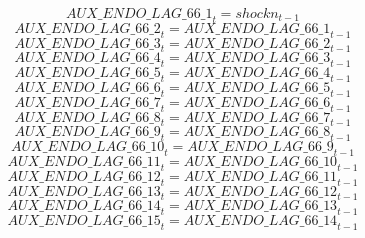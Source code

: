 \begin{dmath}
{AUX\_ENDO\_LAG\_66\_1}_{t}={{shockn}}_{t-1}
\end{dmath}
\begin{dmath}
{AUX\_ENDO\_LAG\_66\_2}_{t}={AUX\_ENDO\_LAG\_66\_1}_{t-1}
\end{dmath}
\begin{dmath}
{AUX\_ENDO\_LAG\_66\_3}_{t}={AUX\_ENDO\_LAG\_66\_2}_{t-1}
\end{dmath}
\begin{dmath}
{AUX\_ENDO\_LAG\_66\_4}_{t}={AUX\_ENDO\_LAG\_66\_3}_{t-1}
\end{dmath}
\begin{dmath}
{AUX\_ENDO\_LAG\_66\_5}_{t}={AUX\_ENDO\_LAG\_66\_4}_{t-1}
\end{dmath}
\begin{dmath}
{AUX\_ENDO\_LAG\_66\_6}_{t}={AUX\_ENDO\_LAG\_66\_5}_{t-1}
\end{dmath}
\begin{dmath}
{AUX\_ENDO\_LAG\_66\_7}_{t}={AUX\_ENDO\_LAG\_66\_6}_{t-1}
\end{dmath}
\begin{dmath}
{AUX\_ENDO\_LAG\_66\_8}_{t}={AUX\_ENDO\_LAG\_66\_7}_{t-1}
\end{dmath}
\begin{dmath}
{AUX\_ENDO\_LAG\_66\_9}_{t}={AUX\_ENDO\_LAG\_66\_8}_{t-1}
\end{dmath}
\begin{dmath}
{AUX\_ENDO\_LAG\_66\_10}_{t}={AUX\_ENDO\_LAG\_66\_9}_{t-1}
\end{dmath}
\begin{dmath}
{AUX\_ENDO\_LAG\_66\_11}_{t}={AUX\_ENDO\_LAG\_66\_10}_{t-1}
\end{dmath}
\begin{dmath}
{AUX\_ENDO\_LAG\_66\_12}_{t}={AUX\_ENDO\_LAG\_66\_11}_{t-1}
\end{dmath}
\begin{dmath}
{AUX\_ENDO\_LAG\_66\_13}_{t}={AUX\_ENDO\_LAG\_66\_12}_{t-1}
\end{dmath}
\begin{dmath}
{AUX\_ENDO\_LAG\_66\_14}_{t}={AUX\_ENDO\_LAG\_66\_13}_{t-1}
\end{dmath}
\begin{dmath}
{AUX\_ENDO\_LAG\_66\_15}_{t}={AUX\_ENDO\_LAG\_66\_14}_{t-1}
\end{dmath}
